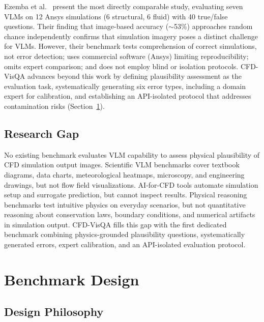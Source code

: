 \documentclass[preprint,12pt]{elsarticle}
\begin{document}
Ezemba et al.\ \cite{ezemba.etal2025SimulationVs} present the most directly comparable
study, evaluating seven VLMs on 12 Ansys simulations (6 structural, 6 fluid) with
40 true/false questions. Their finding that image-based accuracy ($\sim$53\%)
approaches random chance independently confirms that simulation imagery poses a
distinct challenge for VLMs. However, their benchmark tests comprehension of
correct simulations, not error detection; uses commercial software (Ansys) limiting
reproducibility; omits expert comparison; and does not employ blind or isolation
protocols. CFD-VisQA advances beyond this work by defining plausibility assessment
as the evaluation task, systematically generating six error types, including a
domain expert for calibration, and establishing an API-isolated protocol that
addresses contamination risks (Section~\ref{sec:benchmark}).

\subsection{Research Gap}

No existing benchmark evaluates VLM capability to assess physical plausibility of
CFD simulation output images. Scientific VLM benchmarks cover textbook diagrams,
data charts, meteorological heatmaps, microscopy, and engineering drawings, but not
flow field visualizations. AI-for-CFD tools automate simulation setup and surrogate
prediction, but cannot inspect results. Physical reasoning benchmarks test
intuitive physics on everyday scenarios, but not quantitative reasoning about
conservation laws, boundary conditions, and numerical artifacts in simulation
output. CFD-VisQA fills this gap with the first dedicated benchmark combining
physics-grounded plausibility questions, systematically generated errors, expert
calibration, and an API-isolated evaluation protocol.


\section{Benchmark Design}
\label{sec:benchmark}

\subsection{Design Philosophy}
\label{sec:design-philosophy}
\end{document}
